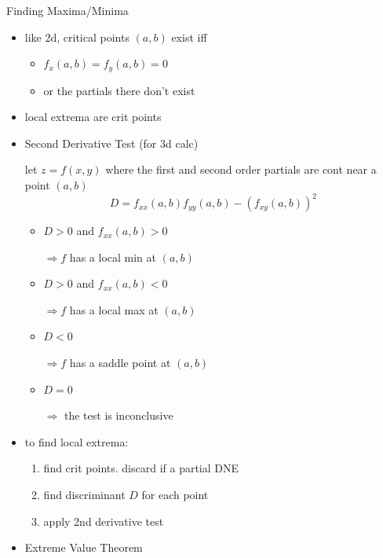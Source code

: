 \documentclass[11pt]{article}
\theoremstyle{definition}
\newcommand{\col}[1]{\begin{minipage}{\columnwidth}#1\end{minipage}}
\begin{document}
\newpage
\begin{multicols}{2}
  \col{
    Finding Maxima/Minima
    \begin{itemize}
      \item like 2d, critical points $(a,b)$ exist iff
      \begin{itemize}
        \item $f_x(a,b) = f_y(a,b) = 0$ 
        \item or the partials there don't exist
      \end{itemize} 
      \item local extrema are crit points
      \item Second Derivative Test (for 3d calc)
      
      let $z=f(x,y)$ where the first and second order partials are cont near a point $(a,b)$
      \[ D = f_{xx}(a,b)f_{yy}(a,b)-(f_{xy}(a,b))^2 \]
      \begin{itemize}
        \item $D > 0$ and $f_{xx}(a,b) > 0$
        
        $\Rightarrow f$ has a local min at $(a,b)$
        \item $D > 0$ and $f_{xx}(a,b) < 0$
        
        $\Rightarrow f$ has a local max at $(a,b)$
        \item $D < 0$
        
        $\Rightarrow f$ has a saddle point at $(a,b)$
        \item $D = 0$
        
        $\Rightarrow$ the test is inconclusive
      \end{itemize}
      \item to find local extrema:
      \begin{enumerate}
        \item find crit points. discard if a partial DNE
        \item find discriminant $D$ for each point
        \item apply 2nd derivative test
      \end{enumerate}
      \item Extreme Value Theorem


\end{itemize}}
\end{multicols}
\end{document}
